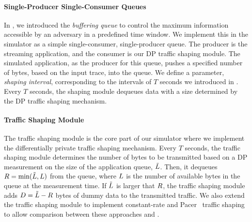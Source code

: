\paragraph{Single-Producer Single-Consumer Queues}\label{subsubsec:design-sim-spsc-queue}
In , we introduced the \textit{buffering queue} to control the maximum information accessible by an adversary in a predefined time window.
We implement this in the simulator as a simple single-consumer, single-producer queue.
The producer is the streaming application, and
the consumer is our DP traffic shaping module.
The simulated application, as the producer for this queue, pushes a specified number of bytes, based on the input trace, into the queue.
We define a parameter, \emph{shaping interval}, corresponding to the intervals of $T$ seconds we introduced in .
Every $T$ seconds, the shaping module dequeues data with a size determined by
the DP traffic shaping mechanism.



\paragraph{Traffic Shaping Module}
The traffic shaping module is the core part of our simulator where we implement the differentially private traffic shaping mechanism.
Every $T$ seconds, the traffic shaping module determines the number of bytes to be transmitted based on a DP measurement on the size of the application queue, $\tilde{L}$.
Then, it dequeues $R = \min(\tilde{L}, L)$ from the queue, where $L$ is the number of available bytes in the queue at the measurement time. 
If $\tilde{L}$ is larger that $R$, the traffic shaping module adds $D = \tilde{L} - R$ bytes of dummy data to the transmitted traffic.
We also extend the traffic shaping module to implement constant-rate and Pacer~\cite{mehta2022pacer} traffic shaping to allow comparison between these approaches and {\sys}. 

